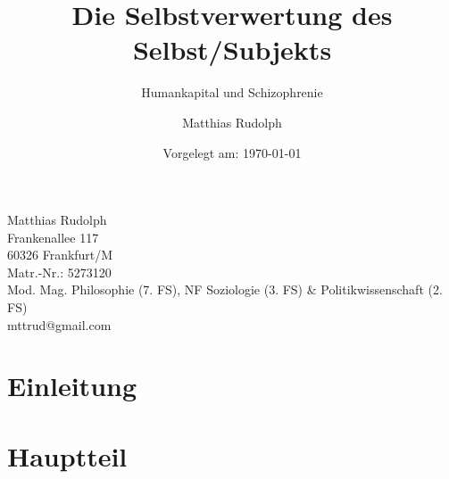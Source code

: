 \documentclass[12pt,
               DIV13,
               paper=a4,
               twoside=false,
               onehalfspacing,
               bibliography=totoc,
               toc=graduated,
               draft,
               ]{scrartcl}
\begin{document}
\setcounter{page}{0}

\titlehead{Goethe-Universität Frankfurt am Main\\
Fachbereich Philosophie und Geschichtswissenschaften\\
Institut für Philosophie\\
Prof. Dr. Christoph Menke\\
Seminar: Demokratie und Kapitalismus,
SoSe 2013\\
Modul: VM 3b}
\title{Die Selbstverwertung des Selbst/Subjekts}
\subtitle{Humankapital und Schizophrenie}
\author{Matthias Rudolph}
\date{Vorgelegt am: \today}

\maketitle
\vfill

\noindent Matthias Rudolph\\
Frankenallee 117\\
60326 Frankfurt/M\\
Matr.-Nr.: 5273120\\
Mod. Mag. Philosophie (7. FS), NF Soziologie (3. FS) \& Politikwissenschaft (2. FS)\\ %
mttrud@gmail.com
\newpage

\tableofcontents
\newpage


\section{Einleitung}

\section{Hauptteil}
\end{document}
